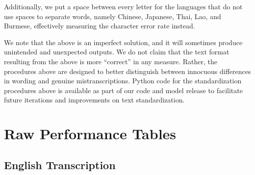 \documentclass[nohyperref]{article}
\theoremstyle{plain}
\theoremstyle{definition}
\theoremstyle{remark}
\begin{document}
Additionally, we put a space between every letter for the languages that do not use spaces to separate words, namely Chinese, Japanese, Thai, Lao, and Burmese, effectively measuring the character error rate instead.

We note that the above is an imperfect solution, and it will sometimes produce unintended and unexpected outputs. We do not claim that the text format resulting from the above is more ``correct'' in any measure. Rather, the procedures above are designed to better distinguish between innocuous differences in wording and genuine mistranscriptions. Python code for the standardization procedures above is available as part of our code and model release to facilitate future iterations and improvements on text standardization.


\vfill
\pagebreak


\section{Raw Performance Tables}\label{sec:raw-performance}

\subsection{English Transcription}
\end{document}
